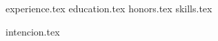 \documentclass[11pt, a4paper]{awesome-cv}
\newcommand*{\sectiondir}{resume/}
\begin{document}
\makecvheader

{experience.tex}
{education.tex}
{honors.tex}
{skills.tex}


\newpage
{intencion.tex}
\end{document}
